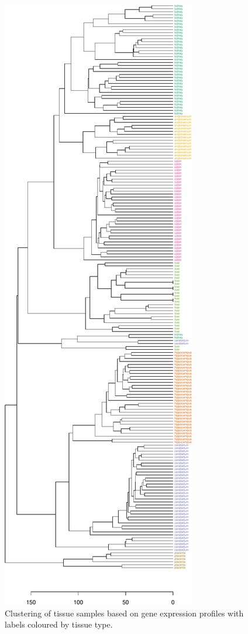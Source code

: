 \documentclass[]{book}
\theoremstyle{definition}
\theoremstyle{definition}
\theoremstyle{definition}
\theoremstyle{remark}
\begin{document}
\begin{figure}

{\centering \includegraphics[width=1\linewidth]{09-clustering_files/figure-latex/tissueDendrogramColour-1} 

}

\caption{Clustering of tissue samples based on gene expression profiles with labels coloured by tissue type. }\label{fig:tissueDendrogramColour}
\end{figure}
\end{document}
